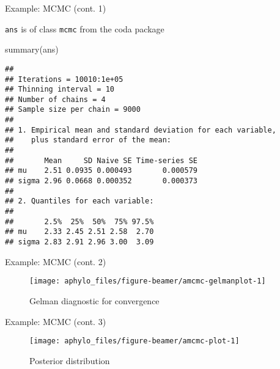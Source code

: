 \documentclass[9pt,handout,ignorenonframetext,]{beamer}
\newenvironment{Shaded}{\begin{snugshade}}{\end{snugshade}}
\newcommand{\KeywordTok}[1]{\textcolor[rgb]{0.94,0.87,0.69}{#1}}
\newcommand{\NormalTok}[1]{\textcolor[rgb]{0.80,0.80,0.80}{#1}}
\begin{document}
\begin{frame}[fragile,t]{Example: MCMC (cont. 1)}

\texttt{ans} is of class \texttt{mcmc} from the coda package

\footnotesize

\begin{Shaded}
\begin{Highlighting}[]
\KeywordTok{summary}\NormalTok{(ans)}
\end{Highlighting}
\end{Shaded}

\begin{verbatim}
## 
## Iterations = 10010:1e+05
## Thinning interval = 10 
## Number of chains = 4 
## Sample size per chain = 9000 
## 
## 1. Empirical mean and standard deviation for each variable,
##    plus standard error of the mean:
## 
##       Mean     SD Naive SE Time-series SE
## mu    2.51 0.0935 0.000493       0.000579
## sigma 2.96 0.0668 0.000352       0.000373
## 
## 2. Quantiles for each variable:
## 
##       2.5%  25%  50%  75% 97.5%
## mu    2.33 2.45 2.51 2.58  2.70
## sigma 2.83 2.91 2.96 3.00  3.09
\end{verbatim}

\normalsize

\end{frame}

\begin{frame}[t]{Example: MCMC (cont. 2)}

\footnotesize

\begin{figure}

{\centering \texttt{[image: aphylo\_files/figure-beamer/amcmc-gelmanplot-1]} 

}

\caption{Gelman diagnostic for convergence}\label{fig:amcmc-gelmanplot}
\end{figure}

\normalsize

\end{frame}

\begin{frame}[t]{Example: MCMC (cont. 3)}

\footnotesize

\begin{figure}

{\centering \texttt{[image: aphylo\_files/figure-beamer/amcmc-plot-1]} 

}

\caption{Posterior distribution}\label{fig:amcmc-plot}
\end{figure}

\normalsize

\end{frame}
\end{document}
